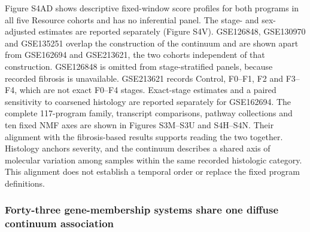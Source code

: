 Figure S4AD shows descriptive fixed-window score profiles for both programs in all five Resource cohorts and has no inferential panel. The stage- and sex-adjusted estimates are reported separately (Figure S4V). GSE126848, GSE130970 and GSE135251 overlap the construction of the continuum and are shown apart from GSE162694 and GSE213621, the two cohorts independent of that construction. GSE126848 is omitted from stage-stratified panels, because recorded fibrosis is unavailable. GSE213621 records Control, F0--F1, F2 and F3--F4, which are not exact F0--F4 stages. Exact-stage estimates and a paired sensitivity to coarsened histology are reported separately for GSE162694. The complete 117-program family, transcript comparisons, pathway collections and ten fixed NMF axes are shown in Figures S3M--S3U and S4H--S4N. Their alignment with the fibrosis-based results supports reading the two together. Histology anchors severity, and the continuum describes a shared axis of molecular variation among samples within the same recorded histologic category. This alignment does not establish a temporal order or replace the fixed program definitions.

\subsubsection{Forty-three gene-membership systems share one diffuse continuum association}\label{forty-three-gene-membership-systems-share-one-diffuse-continuum-association}

